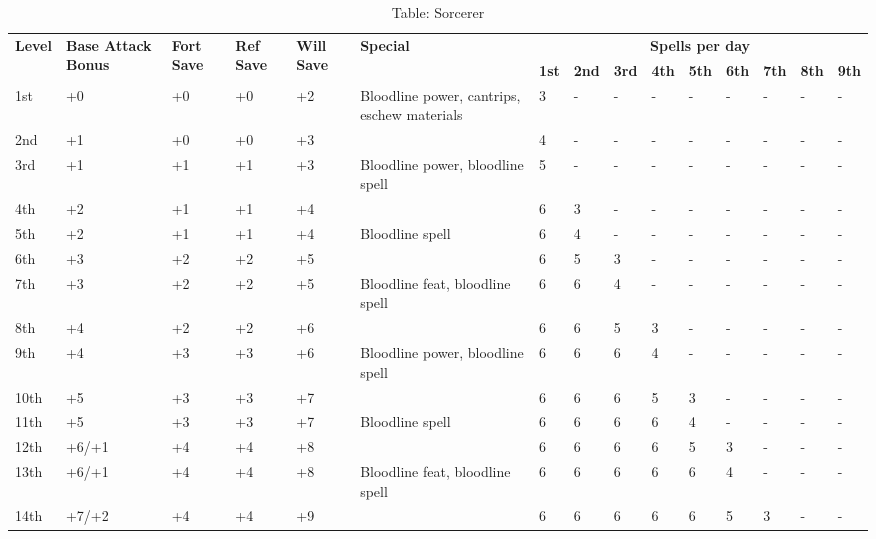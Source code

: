 \begin{table*}[]
\caption{Table: Sorcerer}
\sffamily
\setlength{\tabcolsep}{1pt}
\begin{tabularx}{\linewidth}{lp{6em}p{2.5em}p{2.5em}p{2.5em}Xlllllllll}
\multirow{2}{*}{\textbf{Level}} & \multirow{2}{*}{\parbox{5em}{\textbf{Base Attack Bonus}}} & \multirow{2}{*}{\parbox{1.5em}{\textbf{Fort Save}}} & \multirow{2}{*}{\parbox{1.5em}{\textbf{Ref Save}}} & \multirow{2}{*}{\parbox{1.5em}{\textbf{Will Save}}} & \textbf{Special}      & \multicolumn{9}{c}{\textbf{Spells per day}} \\
                       &                                    &                            &                           &                            &                                                                                                  & \textbf{1st} & \textbf{2nd} & \textbf{3rd} & \textbf{4th} & \textbf{5th} & \textbf{6th} & \textbf{7th} & \textbf{8th} & \textbf{9th} \\
1st & +0 & +0 & +0 & +2 & Bloodline power, cantrips, eschew materials & 3 & - & - & - & - & - & - & - & -\\
2nd & +1 & +0 & +0 & +3 &  & 4 & - & - & - & - & - & - & - & -\\
3rd & +1 & +1 & +1 & +3 & Bloodline power, bloodline spell & 5 & - & - & - & - & - & - & - & -\\
4th & +2 & +1 & +1 & +4 &  & 6 & 3 & - & - & - & - & - & - & -\\
5th & +2 & +1 & +1 & +4 & Bloodline spell & 6 & 4 & - & - & - & - & - & - & -\\
6th & +3 & +2 & +2 & +5 &  & 6 & 5 & 3 & - & - & - & - & - & -\\
7th & +3 & +2 & +2 & +5 & Bloodline feat, bloodline spell & 6 & 6 & 4 & - & - & - & - & - & -\\
8th & +4 & +2 & +2 & +6 &  & 6 & 6 & 5 & 3 & - & - & - & - & -\\
9th & +4 & +3 & +3 & +6 & Bloodline power, bloodline spell & 6 & 6 & 6 & 4 & - & - & - & - & -\\
10th & +5 & +3 & +3 & +7 &  & 6 & 6 & 6 & 5 & 3 & - & - & - & -\\
11th & +5 & +3 & +3 & +7 & Bloodline spell & 6 & 6 & 6 & 6 & 4 & - & - & - & -\\
12th & +6/+1 & +4 & +4 & +8 &  & 6 & 6 & 6 & 6 & 5 & 3 & - & - & -\\
13th & +6/+1 & +4 & +4 & +8 & Bloodline feat, bloodline spell & 6 & 6 & 6 & 6 & 6 & 4 & - & - & -\\
14th & +7/+2 & +4 & +4 & +9 &  & 6 & 6 & 6 & 6 & 6 & 5 & 3 & - & -\\

\end{tabularx}
\end{table*}
